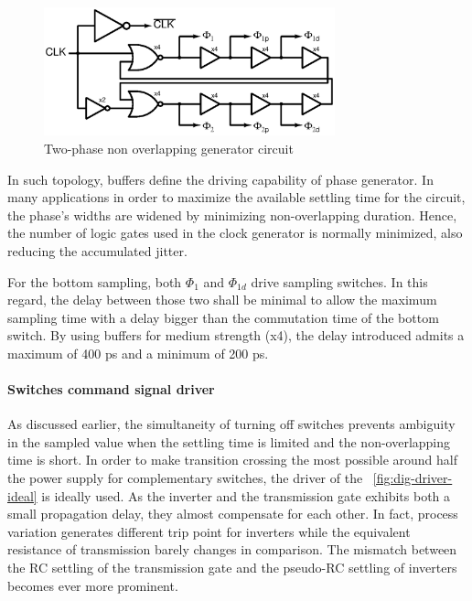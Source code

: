 \begin{figure}[htp]
	\centering
	\includegraphics[width=0.75\textwidth]{Chapter4/Figs/non-overlapp.ps}
	\caption{Two-phase non overlapping generator circuit}
	\label{fig:non-ov}
\end{figure}

In such topology, buffers define the driving capability of phase generator. In many applications in order to maximize the available settling time for the circuit, the phase's widths are widened by minimizing non-overlapping duration. Hence, the number of logic gates used in the clock generator is normally minimized, also reducing the accumulated jitter. 

For the bottom sampling, both \(\Phi_1\) and \(\Phi_{1d}\) drive sampling switches. In this regard, the delay between those two shall be minimal to allow the maximum sampling time with a delay bigger than the commutation time of the bottom switch. By using buffers for medium strength (x4), the delay introduced admits a maximum of 400 ps and a minimum of 200 ps.
\paragraph{Switches command signal driver}
\label{sec:dig-driver}

As discussed earlier, the simultaneity of turning off switches prevents ambiguity in the sampled value when the settling time is limited and the non-overlapping time is short. In order to make transition crossing the most possible around half the power supply for complementary switches, the driver of the \figurename~\ref{fig:dig-driver-ideal} is ideally used. As the inverter and the transmission gate exhibits both a small propagation delay, they almost compensate for each other. In fact, process variation generates different trip point for inverters while the equivalent resistance of transmission barely changes in comparison. The mismatch between the RC settling of the transmission gate and the pseudo-RC settling of inverters becomes ever more prominent. 

